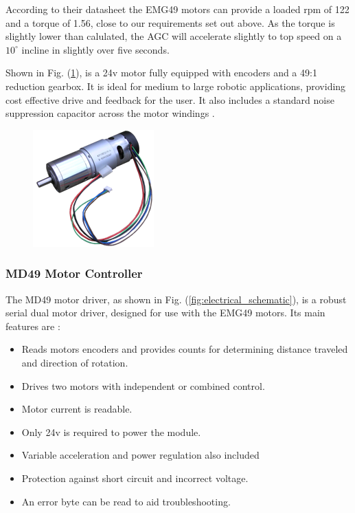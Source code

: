 \documentclass[11pt,landscape]{article}
\begin{document}
\begin{multicols}{3}
According to their datasheet the EMG49 motors can provide a loaded rpm of 122
and a torque of 1.56, close to our requirements set out above. As the torque is
slightly lower than calulated, the AGC will accelerate slightly to top speed on
a $10^\circ$ incline in slightly over five seconds.

Shown in Fig. (\ref{fig:emg49}), is a 24v motor fully equipped with
encoders and a 49:1 reduction gearbox. It is ideal for medium to large robotic
applications, providing cost effective drive and feedback for the user. It also
includes a standard noise suppression capacitor across the motor windings
\cite{emg49data}.
\begin{figure}[H]
    \begin{center}
    \includegraphics[]{emg49.png}
\end{center}
\label{fig:emg49}
\end{figure}

\subsubsection{MD49 Motor Controller}
The MD49 motor driver, as shown in Fig. (\ref{fig:electrical_schematic}), is a
robust serial dual motor driver, designed for use with the EMG49 motors. Its
main features are \cite{md49data}:

\begin{itemize}
    \item Reads motors encoders and provides counts for determining distance traveled and direction of rotation.
    \item Drives two motors with independent or combined control. 
    \item Motor current is readable.
    \item Only 24v is required to power the module.
    \item Variable acceleration and power regulation also included
    \item Protection against short circuit and incorrect voltage. 
    \item An error byte can be read to aid troubleshooting.
\end{itemize}


\end{multicols}
\end{document}
